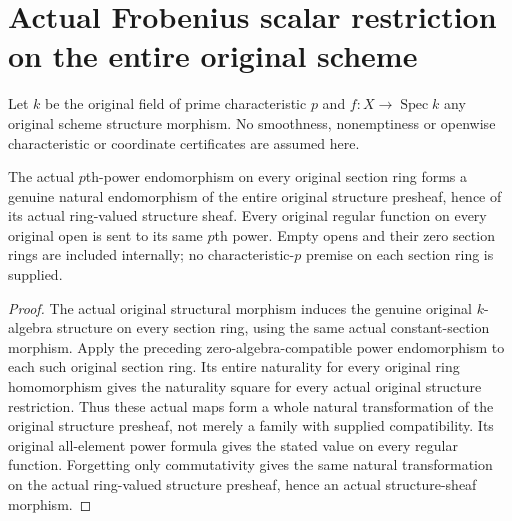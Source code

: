 \section{Actual Frobenius scalar restriction on the entire original scheme}
\label{sec:scheme-frobenius-scalar-restriction}

Let $k$ be the original field of prime characteristic $p$ and
$f:X\to\operatorname{Spec}k$ any original scheme structure morphism.
No smoothness, nonemptiness or openwise characteristic or coordinate
certificates are assumed here.

\begin{theorem}
\label{lem:cartier-entire-scheme-frobenius-coefficients}
\leanok
The actual $p$th-power endomorphism on every original section ring
forms a genuine natural endomorphism of the entire original
structure presheaf, hence of its actual ring-valued structure sheaf.
Every original regular function on every original open is sent to
its same $p$th power. Empty opens and their zero section rings are
included internally; no characteristic-$p$ premise on each section
ring is supplied.
\end{theorem}
\begin{proof}
The actual original structural morphism induces the genuine original
$k$-algebra structure on every section ring, using the same actual
constant-section morphism. Apply the preceding zero-algebra-compatible
power endomorphism to each such original section ring. Its entire
naturality for every original ring homomorphism gives the naturality
square for every actual original structure restriction. Thus these
actual maps form a whole natural transformation of the original
structure presheaf, not merely a family with supplied compatibility.
Its original all-element power formula gives the stated value on
every regular function. Forgetting only commutativity gives the
same natural transformation on the actual ring-valued structure
presheaf, hence an actual structure-sheaf morphism.
\end{proof}

